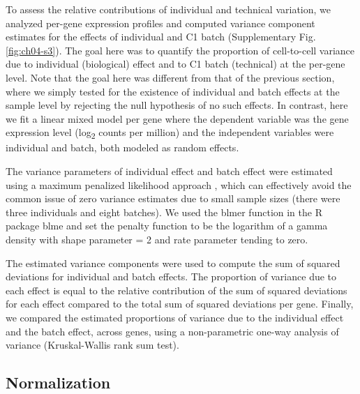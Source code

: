 To assess the relative contributions of individual and technical
variation, we analyzed per-gene expression profiles and computed
variance component estimates for the effects of individual and C1
batch (Supplementary Fig. \ref{fig:ch04-s3}). The goal here was to
quantify the proportion of cell-to-cell variance due to individual
(biological) effect and to C1 batch (technical) at the per-gene
level. Note that the goal here was different from that of the previous
section, where we simply tested for the existence of individual and
batch effects at the sample level by rejecting the null hypothesis of
no such effects. In contrast, here we fit a linear mixed model per
gene where the dependent variable was the gene expression level
(log\textsubscript{2} counts per million) and the independent
variables were individual and batch, both modeled as random effects.

The variance parameters of individual effect and batch effect were
estimated using a maximum penalized likelihood approach
\citep{Chung2013}, which can effectively avoid the common issue of
zero variance estimates due to small sample sizes (there were three
individuals and eight batches). We used the blmer function in the R
package blme and set the penalty function to be the logarithm of a
gamma density with shape parameter = 2 and rate parameter tending to
zero.

The estimated variance components were used to compute the sum of
squared deviations for individual and batch effects. The proportion of
variance due to each effect is equal to the relative contribution of
the sum of squared deviations for each effect compared to the total
sum of squared deviations per gene. Finally, we compared the estimated
proportions of variance due to the individual effect and the batch
effect, across genes, using a non-parametric one-way analysis of
variance (Kruskal-Wallis rank sum test).

\subsection{Normalization}\label{normalization}

